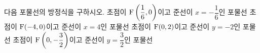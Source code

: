 다음 포물선의 방정식을 구하시오.
 초점이 $\mathrm{F}\left(\dfrac{1}{6}{,}\mkern3mu\mathopen{}0\right)$이고 준선이 $x=-\dfrac{1}{6}$인 포물선
 초점이 $\mathrm{F}(-4{,}\mkern3mu\mathopen{}0)$이고 준선이 $x=4$인 포물선
 초점이 $\mathrm{F}(0{,}\mkern3mu\mathopen{}2)$이고 준선이 $y=-2$인 포물선
 초점이 $\mathrm{F}\left(0{,}\mkern3mu\mathopen{}-\dfrac{3}{2}\right)$이고 준선이 $y=\dfrac{3}{2}$인 포물선
